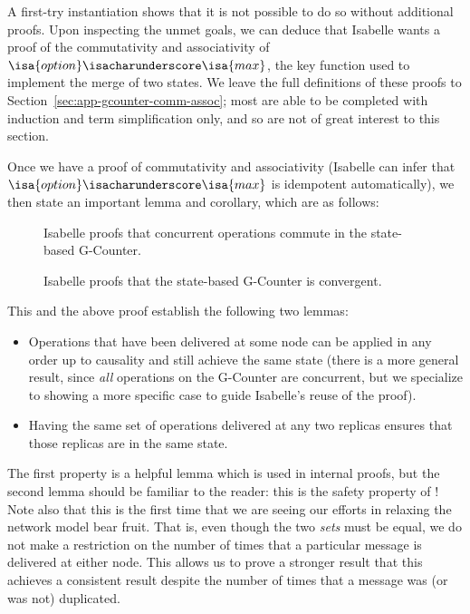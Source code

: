 A first-try instantiation shows that it is not possible to do so without
additional proofs. Upon inspecting the unmet goals, we can deduce that Isabelle
wants a proof of the commutativity and associativity of
$\isa{option}\isacharunderscore\isa{max}$, the key function used to implement
the merge of two states. We leave the full definitions of these proofs to
Section~\ref{sec:app-gcounter-comm-assoc}; most are able to be completed with
induction and term simplification only, and so are not of great interest to this
section.

Once we have a proof of commutativity and associativity (Isabelle can infer that
$\isa{option}\isacharunderscore\isa{max}$ is idempotent automatically), we then
state an important lemma and corollary, which are as follows:

\begin{figure}[H]
  
  \caption{Isabelle proofs that concurrent operations commute in the state-based
    G-Counter.}
\end{figure}

\begin{figure}[H]
  
  \caption{Isabelle proofs that the state-based G-Counter is convergent.}
\end{figure}

This and the above proof establish the following two lemmas:
\begin{itemize}
  \item Operations that have been delivered at some node can be applied in any
    order up to causality and still achieve the same state (there is a more
    general result, since \emph{all} operations on the G-Counter are concurrent,
    but we specialize to showing a more specific case to guide Isabelle's reuse
    of the proof).
  \item Having the same set of operations delivered at any two replicas ensures
    that those replicas are in the same state.
\end{itemize}

The first property is a helpful lemma which is used in internal proofs, but the
second lemma should be familiar to the reader: this is the safety property of
\SEC! Note also that this is the first time that we are seeing our efforts in
relaxing the network model bear fruit. That is, even though the two \emph{sets}
must be equal, we do not make a restriction on the number of times that a
particular message is delivered at either node. This allows us to prove a
stronger result that this \CRDT achieves a consistent result despite the number
of times that a message was (or was not) duplicated.

